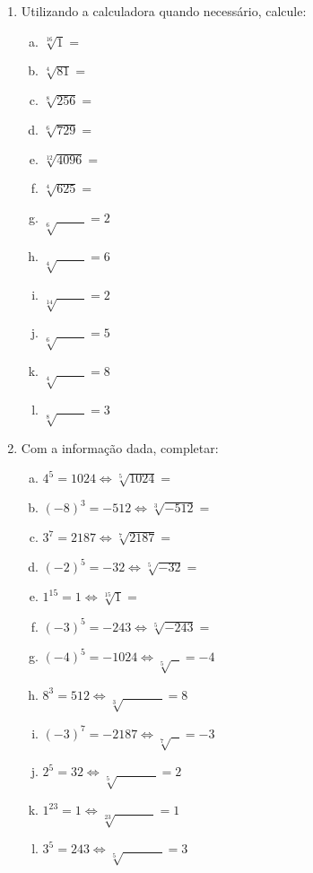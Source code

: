 \documentclass[a4paper,14pt]{article}
\begin{document}
\begin{multicols}{2}
\begin{enumerate}
        \item Utilizando a calculadora quando necessário, calcule:
		\begin{enumerate}[a)]
        	\item $\sqrt[16]{1} = $
        	\item $\sqrt[4]{81} = $
        	\item $\sqrt[8]{256} = $
        	\item $\sqrt[6]{729} = $
        	\item $\sqrt[12]{4096} = $
        	\item $\sqrt[4]{625} = $
        	\item $\sqrt[6]{~~~~~~~~~~} = 2$
        	\item $\sqrt[4]{~~~~~~~~~~} = 6$
        	\item $\sqrt[14]{~~~~~~~~~~} = 2$
        	\item $\sqrt[6]{~~~~~~~~~~} = 5$
        	\item $\sqrt[4]{~~~~~~~~~~} = 8$
        	\item $\sqrt[8]{~~~~~~~~~~} = 3$
        \end{enumerate}
        \item Com a informação dada, completar:
        \begin{enumerate}[a)]
        	\item $4^5 = 1024 \Leftrightarrow \sqrt[5]{1024} = $
        	\item $(-8)^3 = -512 \Leftrightarrow \sqrt[3]{-512} = $
        	\item $3^7 = 2187 \Leftrightarrow \sqrt[7]{2187} = $
        	\item $(-2)^5 = -32 \Leftrightarrow \sqrt[5]{-32} = $
        	\item $1^{15} = 1 \Leftrightarrow \sqrt[15]{1} = $
        	\item $(-3)^5 = -243 \Leftrightarrow \sqrt[5]{-243} = $
        	\item $(-4)^5 = -1024 \Leftrightarrow \sqrt[5]{~~~} = -4$
        	\item $8^3 = 512 \Leftrightarrow \sqrt[3]{~~~~~~~~~~~~~~} = 8 $
        	\item $(-3)^7 = -2187 \Leftrightarrow \sqrt[7]{~~~} = -3$
        	\item $2^5 = 32 \Leftrightarrow \sqrt[5]{~~~~~~~~~~~~~~} = 2$
        	\item $1^{23} = 1 \Leftrightarrow \sqrt[23]{~~~~~~~~~~~~~~} = 1$
        	\item $3^5 = 243 \Leftrightarrow \sqrt[5]{~~~~~~~~~~~~~~} = 3$

\end{enumerate}
\end{enumerate}
\end{multicols}
\end{document}
